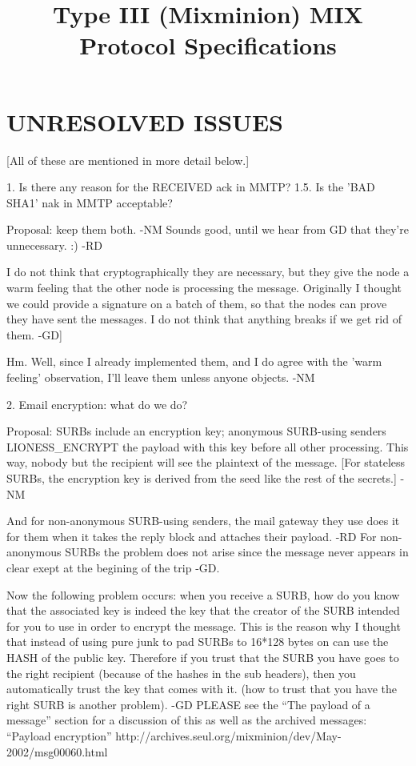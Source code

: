 \title{Type III (Mixminion) MIX Protocol Specifications}

\section{UNRESOLVED ISSUES}

[All of these are mentioned in more detail below.]


1. Is there any reason for the RECEIVED ack in MMTP?
1.5. Is the 'BAD SHA1' nak in MMTP acceptable?

   Proposal: keep them both. -NM
   Sounds good, until we hear from GD that they're unnecessary. :) -RD

   I do not think that cryptographically they are necessary, but they
   give the node a warm feeling that the other node is processing the
   message. Originally I thought we could provide a signature on a
   batch of them, so that the nodes can prove they have sent the
   messages. I do not think that anything breaks if we get rid of
   them. -GD]

   Hm.  Well, since I already implemented them, and I do agree with
   the 'warm feeling' observation, I'll leave them unless anyone
   objects. -NM
 
2. Email encryption: what do we do?

   Proposal: SURBs include an encryption key; anonymous SURB-using
   senders LIONESS_ENCRYPT the payload with this key before all other
   processing.  This way, nobody but the recipient will see the
   plaintext of the message. [For stateless SURBs, the encryption key
   is derived from the seed like the rest of the secrets.] -NM

   And for non-anonymous SURB-using senders, the mail gateway they
   use does it for them when it takes the reply block and attaches their
   payload. -RD
   For non-anonymous SURBs the problem does not arise since the
   message never appears in clear exept at the begining of the trip
   -GD.

   Now the following problem occurs: when you receive a SURB, how do
   you know that the associated key is indeed the key that the creator
   of the SURB intended for you to use in order to encrypt the
   message. This is the reason why I thought that instead of using
   pure junk to pad SURBs to 16*128 bytes on can use the HASH of the
   public key. Therefore if you trust that the SURB you have goes to
   the right recipient (because of the hashes in the sub headers), 
   then you automatically trust the key that
   comes with it. (how to trust that you have the right SURB is
   another problem). -GD
   PLEASE see the ``The payload of a message'' section for a
   discussion of this as well as the archived messages:
   ``Payload encryption''
   http://archives.seul.org/mixminion/dev/May-2002/msg00060.html

